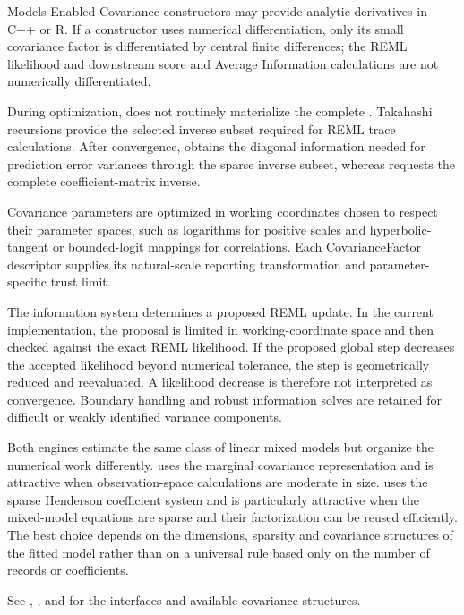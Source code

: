\documentclass[a4paper]{book}
\begin{document}
\begin{Section}{Models Enabled}
Covariance constructors may provide analytic derivatives in C++ or R. If a
constructor uses numerical differentiation, only its small covariance factor
 is differentiated by central finite differences; the REML
likelihood and downstream score and Average Information calculations are not
numerically differentiated.


During optimization,  does not routinely materialize the complete
. Takahashi recursions provide the selected inverse subset required
for REML trace calculations. After convergence,  obtains the
diagonal information needed for prediction error variances through the sparse
inverse subset, whereas  requests the complete
coefficient-matrix inverse.


Covariance parameters are optimized in working coordinates chosen to respect
their parameter spaces, such as logarithms for positive scales and
hyperbolic-tangent or bounded-logit mappings for correlations. Each
CovarianceFactor descriptor supplies its natural-scale reporting
transformation and parameter-specific trust limit.

The information system determines a proposed REML update. In the current
 implementation, the proposal is limited in working-coordinate
space and then checked against the exact REML likelihood. If the proposed
global step decreases the accepted likelihood beyond numerical tolerance, the
step is geometrically reduced and reevaluated. A likelihood decrease is
therefore not interpreted as convergence. Boundary handling and robust
information solves are retained for difficult or weakly identified variance
components.


Both engines estimate the same class of linear mixed models but organize the
numerical work differently.  uses the marginal covariance
representation and is attractive when observation-space calculations are
moderate in size.  uses the sparse Henderson coefficient system and
is particularly attractive when the mixed-model equations are sparse and
their factorization can be reused efficiently. The best choice depends on the
dimensions, sparsity and covariance structures of the fitted model rather than
on a universal rule based only on the number of records or coefficients.

See , , and  for the
interfaces and available covariance structures.

\end{Section}
\end{document}
